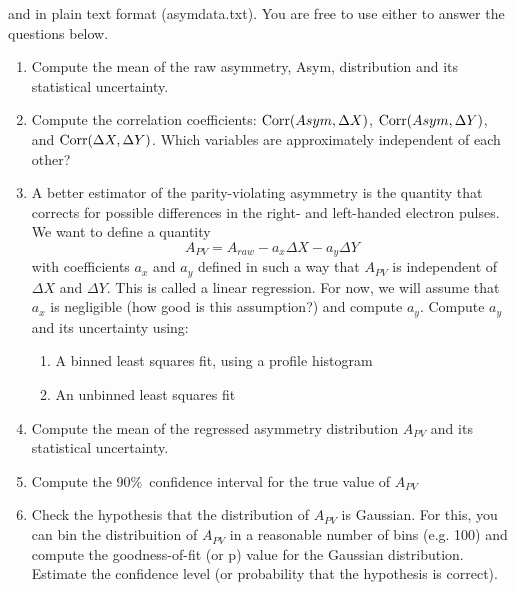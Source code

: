 \documentclass[12pt]{article}
\begin{document}
and in plain text format (asymdata.txt).
You are free to use either to answer the questions below.
\begin{enumerate}
\item  Compute the mean of the raw asymmetry, Asym,
  distribution and its statistical uncertainty.
\item Compute the correlation coefficients: ${\rm Corr}(Asym,\Delta X)$,
  ${\rm Corr}(Asym,\Delta Y)$, and ${\rm Corr}(\Delta X,\Delta Y)$.
  Which variables are approximately independent of each other?
\item A better estimator of the parity-violating asymmetry is the quantity that
  corrects for possible differences in the right- and left-handed
  electron pulses. We want to define a quantity
  $$  A_{PV} = A_{raw} - a_x \Delta X - a_y \Delta Y $$
  with coefficients $a_x$ and $a_y$ defined in such a way that
  $A_{PV}$ is independent of $\Delta X$ and $\Delta Y$.
  This is called a linear regression. For now, we will assume that $a_x$ is negligible (how good is this assumption?) and compute $a_y$. Compute $a_y$ and its
  uncertainty using:
   \begin{enumerate}
   \item A binned least squares fit, using a profile histogram
   \item An unbinned least squares fit
   \end{enumerate}
 \item Compute the mean of the regressed asymmetry distribution $A_{PV}$ and
   its statistical uncertainty.
\item Compute the 90\%\ confidence interval for the true value of $A_{PV}$
\item Check the hypothesis that the distribution of $A_{PV}$ is Gaussian. For this, you can bin the distribuition of $A_{PV}$ in a reasonable number of bins (e.g. 100) and compute the goodness-of-fit (or p) value for the Gaussian distribution. Estimate the confidence level (or probability that the hypothesis is correct). 
\end{enumerate}
\end{document}
